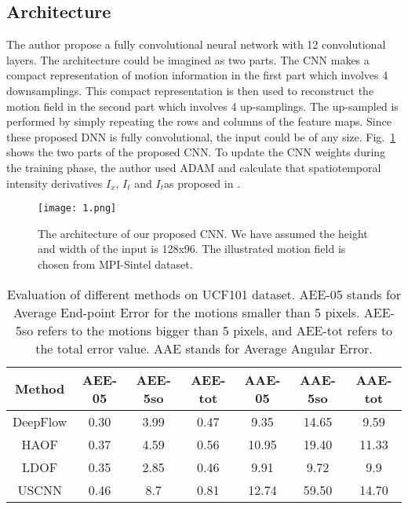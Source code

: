 \documentclass[10pt,twocolumn,letterpaper]{article}
\begin{document}
\subsection{Architecture}
The author propose a fully convolutional neural network with 12 convolutional layers. The architecture could be imagined as two parts. The CNN makes a compact representation of motion information in the first part which involves 4 downsamplings. This compact representation is then used to reconstruct the motion field in the second part which involves 4 up-samplings. The up-sampled is performed by simply repeating the rows and columns of the feature maps. Since these proposed DNN is fully convolutional, the input could be of any size. Fig.~\ref{1} shows the two parts of the proposed CNN. To update the CNN weights during the training phase, the author used ADAM and calculate that spatiotemporal intensity
derivatives $I_x$, $I_t$ and $I_t$as proposed in \cite{Butler2012A}.

\begin{figure*}
\begin{center}
  \texttt{[image: 1.png]}\\
  \caption{The architecture of our proposed CNN. We have assumed the height and width of the input is 128x96. The illustrated motion field is chosen from MPI-Sintel dataset.}\label{1}
\end{center}
\end{figure*}

\begin{table*}[htbp]
\centering
\caption{Evaluation of different methods on UCF101 dataset. AEE-05 stands for Average End-point Error for the motions
smaller than 5 pixels. AEE-5so refers to the motions bigger than 5 pixels, and AEE-tot refers to the total error value. AAE
stands for Average Angular Error.}
\begin{tabular}{|c|c|c|c|c|c|c|}
\hline
Method & AEE-05 & AEE-5so & AEE-tot & AAE-05 & AAE-5so & AAE-tot \\
\hline
\hline
DeepFlow & 0.30 & 3.99 & 0.47 & 9.35 & 14.65 & 9.59 \\

HAOF & 0.37 & 4.59 & 0.56 & 10.95 & 19.40 & 11.33 \\

LDOF & 0.35 & 2.85 & 0.46 & 9.91 & 9.72 & 9.9 \\

USCNN & 0.46 & 8.7 & 0.81 & 12.74 & 59.50 & 14.70 \\
\hline
\end{tabular} \\
\label{tab1}
\end{table*}
\end{document}
